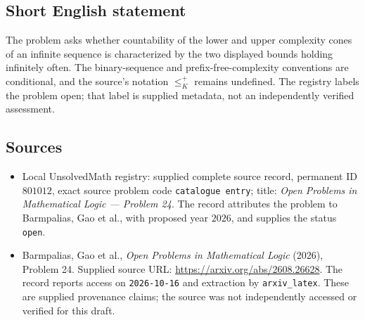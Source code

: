 \documentclass[11pt]{article}
\begin{document}
\subsection{Short English statement}
The problem asks whether countability of the lower and upper complexity cones of an infinite sequence is characterized by the two displayed bounds holding infinitely often. The binary-sequence and prefix-free-complexity conventions are conditional, and the source's notation \(\leq_K^+\) remains undefined. The registry labels the problem open; that label is supplied metadata, not an independently verified assessment.
\subsection{Sources}
\begin{itemize}
\item Local UnsolvedMath registry: supplied complete source record, permanent ID \(801012\), exact source problem code \texttt{catalogue entry}; title: \emph{Open Problems in Mathematical Logic --- Problem 24}. The record attributes the problem to Barmpalias, Gao et al., with proposed year \(2026\), and supplies the status \texttt{open}.
\item Barmpalias, Gao et al., \emph{Open Problems in Mathematical Logic} (2026), Problem 24. Supplied source URL: \url{https://arxiv.org/abs/2608.26628}. The record reports access on \texttt{2026-10-16} and extraction by \texttt{arxiv\_latex}. These are supplied provenance claims; the source was not independently accessed or verified for this draft.
\end{itemize}
\end{document}
